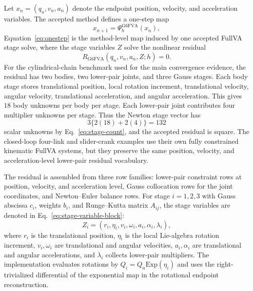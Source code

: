 \documentclass[preprint,12pt]{elsarticle}
\begin{document}
Let $x_n=(q_n,v_n,a_n)$ denote the endpoint position, velocity, and
acceleration variables. The accepted method defines a one-step map
\begin{equation}
  x_{n+1}=\Psi_h^{\mathrm{G6FVA}}(x_n),
  \label{eq:onestep}
\end{equation}
Equation~\eqref{eq:onestep} is the method-level map induced by one accepted
FullVA stage solve, where the stage variables $Z$ solve the nonlinear residual
\begin{equation}
  R_{\mathrm{G6FVA}}(q_n,v_n,a_n,Z;h)=0 .
  \label{eq:residual}
\end{equation}
For the cylindrical-chain benchmark used for the main convergence evidence,
the residual has two bodies, two lower-pair joints, and three Gauss stages.
Each body stage stores translational position, local rotation increment,
translational velocity, angular velocity, translational acceleration, and
angular acceleration. This gives $18$ body unknowns per body per stage. Each
lower-pair joint contributes four multiplier unknowns per stage. Thus the
Newton stage vector has
\begin{equation}
  3\{2(18)+2(4)\}=132
  \label{eq:stage-count}
\end{equation}
scalar unknowns by Eq.~\eqref{eq:stage-count}, and the accepted residual is
square. The closed-loop
four-link and slider-crank examples use their own fully constrained
kinematic FullVA systems, but they preserve the same position, velocity, and
acceleration-level lower-pair residual vocabulary.

The residual is assembled from three row families: lower-pair constraint
rows at position, velocity, and acceleration level, Gauss collocation rows
for the joint coordinates, and Newton--Euler balance rows. For stage
$i=1,2,3$ with Gauss abscissa $c_i$, weights $b_i$, and Runge--Kutta matrix
$A_{ij}$, the stage variables are denoted in Eq.~\eqref{eq:stage-variable-block}:
\begin{equation}
\label{eq:stage-variable-block}
  Z_i=(r_i,\eta_i,v_i,\omega_i,a_i,\alpha_i,\lambda_i),
\end{equation}
where $r_i$ is the translational position, $\eta_i$ is the local Lie-algebra
rotation increment, $v_i,\omega_i$ are translational and angular velocities,
$a_i,\alpha_i$ are translational and angular accelerations, and $\lambda_i$
collects lower-pair multipliers. The implementation evaluates rotations by
$Q_i=Q_n\mathrm{Exp}(\eta_i)$ and uses the right-trivialized differential of
the exponential map in the rotational endpoint reconstruction.
\end{document}
